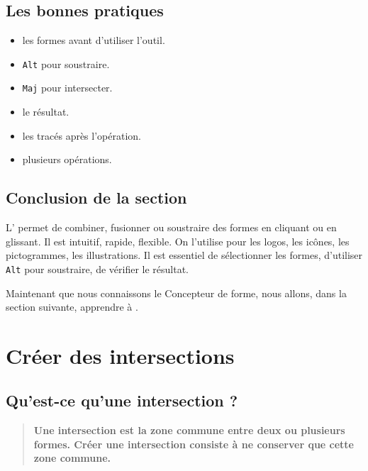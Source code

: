 \subsection{Les bonnes pratiques}

\begin{itemize}
    \item {} les formes avant d'utiliser l'outil.
    \item {} \texttt{Alt} pour soustraire.
    \item {} \texttt{Maj} pour intersecter.
    \item {} le résultat.
    \item {} les tracés après l'opération.
    \item {} plusieurs opérations.
\end{itemize}

\subsection*{Conclusion de la section}

L' permet de combiner, fusionner ou soustraire des formes en cliquant ou en glissant. Il est intuitif, rapide, flexible. On l'utilise pour les logos, les icônes, les pictogrammes, les illustrations. Il est essentiel de sélectionner les formes, d'utiliser \texttt{Alt} pour soustraire, de vérifier le résultat.

Maintenant que nous connaissons le Concepteur de forme, nous allons, dans la section suivante, apprendre à .

\section{Créer des intersections}

\subsection{Qu'est-ce qu'une intersection ?}

\begin{quote}
\textbf{Une intersection est la zone commune entre deux ou plusieurs formes. Créer une intersection consiste à ne conserver que cette zone commune.}
\end{quote}

